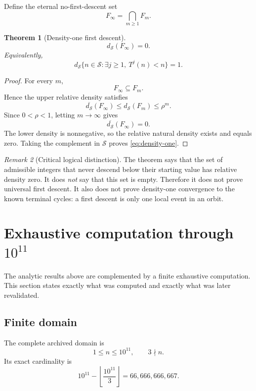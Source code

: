 \documentclass[11pt]{article}
\newtheorem{theorem}{Theorem}[section]
\theoremstyle{definition}
\theoremstyle{remark}
\newtheorem{remark}[theorem]{Remark}
\newcommand{\Sset}{\mathcal S}
\newcommand{\ds}{d_{\Sset}}
\begin{document}
Define the eternal no-first-descent set
\begin{equation}
F_\infty=\bigcap_{m\ge1}F_m.
\label{eq:Finfty}
\end{equation}

\begin{theorem}[Density-one first descent]
\begin{equation}
\boxed{
\ds(F_\infty)=0.
}
\label{eq:Finfty-density}
\end{equation}
Equivalently,
\begin{equation}
\boxed{
\ds\{n\in\Sset:\exists j\ge1,\ T^j(n)<n\}=1.
}
\label{eq:density-one}
\end{equation}
\end{theorem}

\begin{proof}
For every $m$,
\[
F_\infty\subseteq F_m.
\]
Hence the upper relative density satisfies
\[
\overline{\ds}(F_\infty)
\le
\ds(F_m)
\le
\rho^m.
\]
Since $0<\rho<1$, letting $m\to\infty$ gives
\[
\overline{\ds}(F_\infty)=0.
\]
The lower density is nonnegative, so the relative natural density exists and equals zero.  Taking the complement in $\Sset$ proves \eqref{eq:density-one}.
\end{proof}

\begin{remark}[Critical logical distinction]
The theorem says that the set of admissible integers that never descend below their starting value has relative density zero.  It does \emph{not} say that this set is empty.  Therefore it does not prove universal first descent.  It also does not prove density-one convergence to the known terminal cycles: a first descent is only one local event in an orbit.
\end{remark}

\section{Exhaustive computation through \texorpdfstring{$10^{11}$}{10 to the 11}}

The analytic results above are complemented by a finite exhaustive computation.  This section states exactly what was computed and exactly what was later revalidated.

\subsection{Finite domain}

The complete archived domain is
\[
1\le n\le10^{11},\qquad3\nmid n.
\]
Its exact cardinality is
\begin{equation}
10^{11}-\left\lfloor\frac{10^{11}}3\right\rfloor
=
66,666,666,667.
\label{eq:domain-count}
\end{equation}
\end{document}
